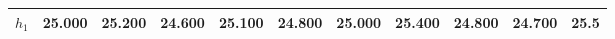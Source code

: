 
        \begin{tabular}{c|*{10}{c}}
            \hline
            \hline
                \(h_{1}\) & 25.000 & 25.200 & 24.600 & 25.100 & 24.800 & 25.000 & 25.400 & 24.800 & 24.700 & 25.5 \\
            \hline
            
            \hline
            \hline
        \end{tabular}
        